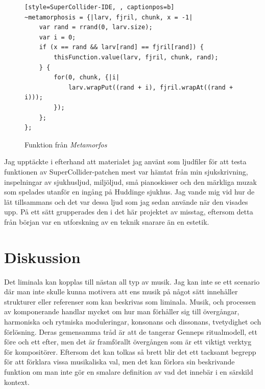 \documentclass{article}
\renewcommand{\baselinestretch}{1.5}
\begin{document}
\begin{figure}[hb]
\renewcommand{\baselinestretch}{1}
\begin{lstlisting}[style=SuperCollider-IDE, , captionpos=b]
~metamorphosis = {|larv, fjril, chunk, x = -1|
	var rand = rrand(0, larv.size);
	var i = 0;
	if (x == rand && larv[rand] == fjril[rand]) {
		thisFunction.value(larv, fjril, chunk, rand);
	} {
		for(0, chunk, {|i|
			larv.wrapPut((rand + i), fjril.wrapAt((rand + i)));
		});
	};
};
\end{lstlisting}
\caption{Funktion från \emph{Metamorfos}}
\end{figure}
\renewcommand{\baselinestretch}{1.5}
\pagebreak

Jag upptäckte i efterhand att materialet jag använt som ljudfiler för att testa funktionen av
SuperCollider-patchen mest var hämtat från min sjukskrivning, inspelningar av sjukhusljud, miljöljud, små
pianoskisser och den märkliga muzak som spelades utanför en ingång på Huddinge sjukhus. Jag vande mig vid hur
de lät tillsammans och det var dessa ljud som jag sedan använde när den visades upp. På ett sätt grupperades
den i det här projektet av misstag, eftersom detta från början var en utforskning av en teknik snarare än en
estetik.


\pagebreak
\section{Diskussion}
Det liminala kan kopplas till nästan all typ av musik. Jag kan inte se ett scenario där man inte skulle kunna
motivera att ens musik på något sätt innehåller strukturer eller referenser som kan beskrivas som liminala.
Musik, och processen av komponerande handlar mycket om hur man förhåller sig till övergångar, harmoniska och
rytmiska moduleringar, konsonans och dissonans, tvetydighet och förlösning. Deras gemensamma tråd är att de
tangerar Genneps ritualmodell, ett före och ett efter, men det är framförallt övergången som är ett viktigt
verktyg för kompositörer. Eftersom det kan tolkas så brett blir det ett tacksamt begrepp för att förklara
vissa musikaliska val, men det kan förlora sin beskrivande funktion om man inte gör en smalare definition av
vad det innebär i en särskild kontext.
\end{document}
